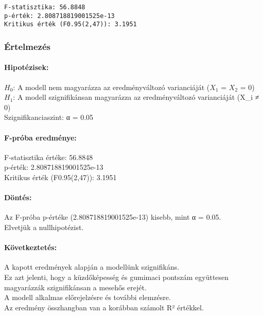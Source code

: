 \documentclass[11pt]{article}
\begin{document}
    \begin{Verbatim}[commandchars=\\\{\}]
F-statisztika: 56.8848
p-érték: 2.808718819001525e-13
Kritikus érték (F0.95(2,47)): 3.1951
    \end{Verbatim}

    \subsubsection{Értelmezés}\label{uxe9rtelmezuxe9s}

\paragraph{Hipotézisek:}\label{hipotuxe9zisek}

$H_0$: A modell nem magyarázza az eredményváltozó varianciáját ($X_1$ = $X_2$ =
0)\\
$H_1$: A modell szignifikánsan magyarázza az eredményváltozó varianciáját
(X\_i ≠ 0)\\
Szignifikanciaszint: α = 0.05

\paragraph{F-próba eredménye:}\label{f-pruxf3ba-eredmuxe9nye}

F-statisztika értéke: 56.8848\\
p-érték: 2.808718819001525e-13\\
Kritikus érték (F0.95(2,47)): 3.1951

\paragraph{Döntés:}\label{duxf6ntuxe9s}

Az F-próba p-értéke (2.808718819001525e-13) kisebb, mint α = 0.05.\\
Elvetjük a nullhipotézist.

\paragraph{Következtetés:}\label{kuxf6vetkeztetuxe9s}

A kapott eredmények alapján a modellünk szignifikáns.\\
Ez azt jelenti, hogy a küzdőképesség és gumimaci pontszám együttesen
magyarázzák szignifikánsan a mesehős erejét.\\
A modell alkalmas előrejelzésre és további elemzésre.\\
Az eredmény összhangban van a korábban számolt R² értékkel.
\end{document}
